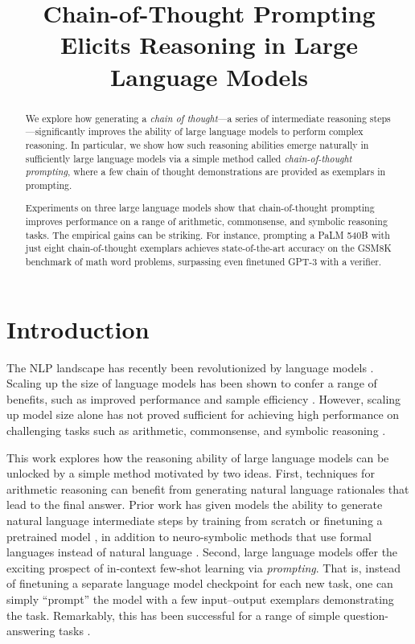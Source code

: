 \title{Chain-of-Thought Prompting Elicits Reasoning in Large Language Models}

\begin{abstract}
We explore how generating a \textit{chain of thought}---a series of intermediate reasoning steps---significantly improves the ability of large language models to perform complex reasoning.
In particular, we show how such reasoning abilities emerge naturally in sufficiently large language models via a simple method called \textit{chain-of-thought prompting}, where a few chain of thought demonstrations are provided as exemplars in prompting.

Experiments on three large language models show that chain-of-thought prompting improves performance on a range of arithmetic, commonsense, and symbolic reasoning tasks.
The empirical gains can be striking.
For instance, prompting a PaLM 540B with just eight chain-of-thought exemplars achieves state-of-the-art accuracy on the GSM8K benchmark of math word problems, surpassing even finetuned GPT-3 with a verifier.
\end{abstract}

\section{Introduction}
The NLP landscape has recently been revolutionized by language models \citep[][\textit{inter alia}]{peters-etal-2018-deep,devlin-etal-2019-bert,brown2020language}.
Scaling up the size of language models has been shown to confer a range of benefits, such as improved performance and sample efficiency  \citep[\textit{inter alia}]{kaplan2020scaling,brown2020language}.
However, scaling up model size alone has not proved sufficient for achieving high performance on challenging tasks such as arithmetic, commonsense, and symbolic reasoning \citep{rae2021scaling}.




This work explores how the reasoning ability of large language models can be unlocked by a simple method motivated by two ideas. 
First, techniques for arithmetic reasoning can benefit from generating natural language rationales that lead to the final answer.
Prior work has given models the ability to generate natural language intermediate steps by training from scratch \citep{ling-etal-2017-program} or finetuning a pretrained model \citep{cobbe2021training}, in addition to neuro-symbolic methods that use formal languages instead of natural language \citep{roy-roth-2015-solving, chiang-chen-2019-semantically,amini-etal-2019-mathqa, chen2019neural}.
Second, large language models offer the exciting prospect of in-context few-shot learning via \emph{prompting}.
That is, instead of finetuning a separate language model checkpoint for each new task, one can simply ``prompt'' the model with a few input--output exemplars demonstrating the task.
Remarkably, this has been successful for a range of simple question-answering tasks \citep{brown2020language}.

